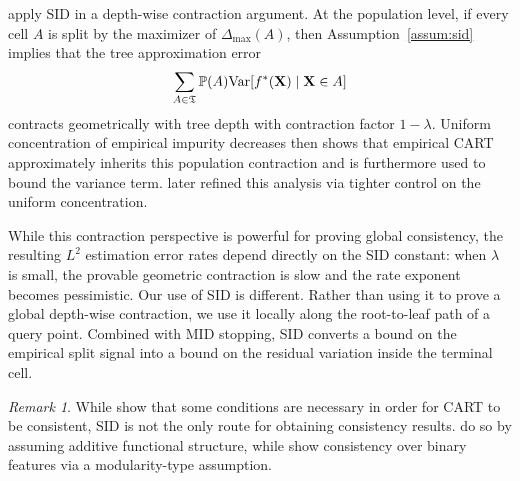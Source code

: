 \documentclass[11pt]{article}
\theoremstyle{plain}
\theoremstyle{definition}
\theoremstyle{remark}
\newtheorem{remark}[theorem]{Remark}
\theoremstyle{plain}
\newcommand{\bX}{\mathbf{X}}
\renewcommand{\P}{\mathbb{P}}
\newcommand{\Var}{\textnormal{Var}}
\newcommand{\tree}{\mathfrak{T}}
\newcommand{\1}{\mathbbm{1}}
\begin{document}
\citet{chi2022asymptotic} apply SID in a depth-wise contraction
argument. 
At the population level, if every cell $A$ is split by the maximizer of $\Delta_{\max}(A)$, then Assumption~\ref{assum:sid} implies that the
tree approximation error
\[
\sum_{A\in \tree}\P(A)\Var[f^*(\bX)\mid \bX\in A]
\]
contracts geometrically with tree depth with contraction factor $1 - \lambda$. 
Uniform concentration of empirical
impurity decreases then shows that empirical CART approximately inherits this
population contraction and is furthermore used to bound the variance term. 
\citet{Mazumder2024} later refined this analysis via tighter control on the uniform concentration.

While this contraction perspective is powerful for proving global consistency, the resulting $L^2$ estimation error rates depend directly on the SID constant: when $\lambda$ is small, the provable geometric contraction is slow and
the rate exponent becomes pessimistic. 
Our use of SID is different. Rather than using it to prove a global depth-wise contraction, we use it locally along the root-to-leaf path of a query point. Combined with MID stopping, SID converts a bound on the empirical split signal into a bound on the residual variation inside the terminal cell.

\begin{remark}
    While \citet{tan2024statistical} show that some conditions are necessary in order for CART to be consistent, SID is not the only route for obtaining consistency results.
    \citet{scornet2016random,klusowski2020sparse,klusowski2024large} do so by assuming additive functional structure, while \citet{syrgkanis2020estimation} show consistency over binary features via a modularity-type assumption.
\end{remark}
\end{document}
